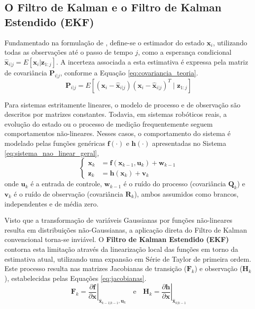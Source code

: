 \documentclass[journal]{IEEEtran}
\begin{document}
\subsection{O Filtro de Kalman e o Filtro de Kalman Estendido (EKF)}
\label{sec:EKF_teoria}

Fundamentado na formulação de \cite{chen2018weak}, define-se o estimador do estado $\mathbf{x}_i$, utilizando todas as observações até o passo de tempo $j$, como a esperança condicional $\hat{\mathbf{x}}_{i|j} = E[\mathbf{x}_i | \mathbf{z}_{1:j}]$. A incerteza associada a esta estimativa é expressa pela matriz de covariância $\mathbf{P}_{i|j}$, conforme a Equação \eqref{eq:covariancia_teoria}.
\begin{equation}
    \label{eq:covariancia_teoria}
    \mathbf{P}_{i|j} = E \left[ (\mathbf{x}_i - \hat{\mathbf{x}}_{i|j}) (\mathbf{x}_i - \hat{\mathbf{x}}_{i|j})^T \mid \mathbf{z}_{1:j} \right]
\end{equation}

Para sistemas estritamente lineares, o modelo de processo e de observação são descritos por matrizes constantes. Todavia, em sistemas robóticos reais, a evolução do estado ou o processo de medição frequentemente seguem comportamentos não-lineares. Nesses casos, o comportamento do sistema é modelado pelas funções genéricas $\mathbf{f}(\cdot)$ e $\mathbf{h}(\cdot)$ apresentadas no Sistema \eqref{eq:sistema_nao_linear_geral},
\begin{equation}
\label{eq:sistema_nao_linear_geral}
\begin{cases}
    \mathbf{x}_k &= \mathbf{f}(\mathbf{x}_{k-1}, \mathbf{u}_k) + \mathbf{w}_{k-1} \\ 
    \mathbf{z}_k &= \mathbf{h}(\mathbf{x}_k) + \mathbf{v}_k      
\end{cases}    
\end{equation}
onde $\mathbf{u}_k$ é a entrada de controle, $\mathbf{w}_{k-1}$ é o ruído do processo (covariância $\mathbf{Q}_k$) e $\mathbf{v}_k$ é o ruído de observação (covariância $\mathbf{R}_k$), ambos assumidos como brancos, independentes e de média zero.

Visto que a transformação de variáveis Gaussianas por funções não-lineares resulta em distribuições não-Gaussianas, a aplicação direta do Filtro de Kalman convencional torna-se inviável. O \textbf{Filtro de Kalman Estendido (EKF)} contorna esta limitação através da linearização local das funções em torno da estimativa atual, utilizando uma expansão em Série de Taylor de primeira ordem. Este processo resulta nas matrizes Jacobianas de transição ($\mathbf{F}_k$) e observação ($\mathbf{H}_k$), estabelecidas pelas Equações \eqref{eq:jacobianas}.
\begin{equation}
    \label{eq:jacobianas}
    \mathbf{F}_k = \left. \frac{\partial \mathbf{f}}{\partial \mathbf{x}} \right|_{\hat{\mathbf{x}}_{k-1|k-1}, \mathbf{u}_k} 
    \quad \text{e} \quad
    \mathbf{H}_k = \left. \frac{\partial \mathbf{h}}{\partial \mathbf{x}} \right|_{\hat{\mathbf{x}}_{k|k-1}}
\end{equation}
\end{document}
